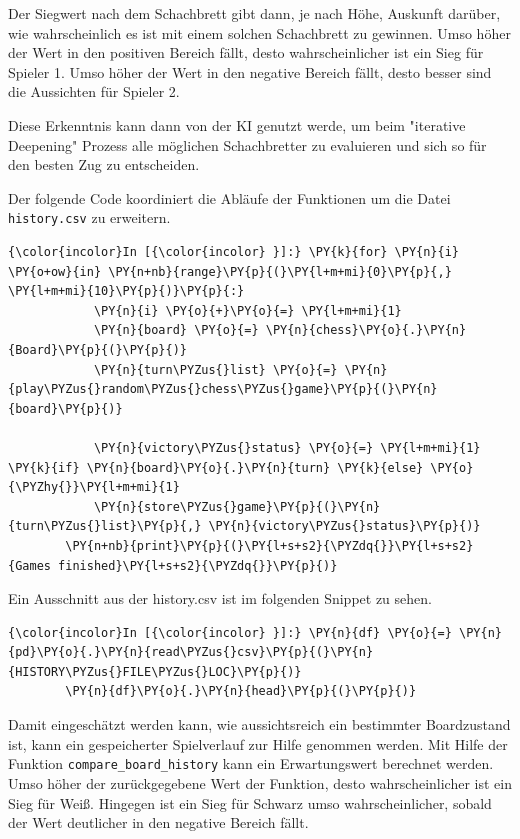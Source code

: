     Der Siegwert nach dem Schachbrett gibt dann, je nach Höhe, Auskunft
darüber, wie wahrscheinlich es ist mit einem solchen Schachbrett zu
gewinnen. Umso höher der Wert in den positiven Bereich fällt, desto
wahrscheinlicher ist ein Sieg für Spieler 1. Umso höher der Wert in den
negative Bereich fällt, desto besser sind die Aussichten für Spieler 2.

Diese Erkenntnis kann dann von der KI genutzt werde, um beim "iterative
Deepening" Prozess alle möglichen Schachbretter zu evaluieren und sich
so für den besten Zug zu entscheiden.

Der folgende Code koordiniert die Abläufe der Funktionen um die Datei
\texttt{history.csv} zu erweitern.

    \begin{Verbatim}[commandchars=\\\{\}]
{\color{incolor}In [{\color{incolor} }]:} \PY{k}{for} \PY{n}{i} \PY{o+ow}{in} \PY{n+nb}{range}\PY{p}{(}\PY{l+m+mi}{0}\PY{p}{,} \PY{l+m+mi}{10}\PY{p}{)}\PY{p}{:}
            \PY{n}{i} \PY{o}{+}\PY{o}{=} \PY{l+m+mi}{1}
            \PY{n}{board} \PY{o}{=} \PY{n}{chess}\PY{o}{.}\PY{n}{Board}\PY{p}{(}\PY{p}{)}
            \PY{n}{turn\PYZus{}list} \PY{o}{=} \PY{n}{play\PYZus{}random\PYZus{}chess\PYZus{}game}\PY{p}{(}\PY{n}{board}\PY{p}{)}
        
            \PY{n}{victory\PYZus{}status} \PY{o}{=} \PY{l+m+mi}{1} \PY{k}{if} \PY{n}{board}\PY{o}{.}\PY{n}{turn} \PY{k}{else} \PY{o}{\PYZhy{}}\PY{l+m+mi}{1}
            \PY{n}{store\PYZus{}game}\PY{p}{(}\PY{n}{turn\PYZus{}list}\PY{p}{,} \PY{n}{victory\PYZus{}status}\PY{p}{)}
        \PY{n+nb}{print}\PY{p}{(}\PY{l+s+s2}{\PYZdq{}}\PY{l+s+s2}{Games finished}\PY{l+s+s2}{\PYZdq{}}\PY{p}{)}
\end{Verbatim}


    Ein Ausschnitt aus der history.csv ist im folgenden Snippet zu sehen.

    \begin{Verbatim}[commandchars=\\\{\}]
{\color{incolor}In [{\color{incolor} }]:} \PY{n}{df} \PY{o}{=} \PY{n}{pd}\PY{o}{.}\PY{n}{read\PYZus{}csv}\PY{p}{(}\PY{n}{HISTORY\PYZus{}FILE\PYZus{}LOC}\PY{p}{)}
        \PY{n}{df}\PY{o}{.}\PY{n}{head}\PY{p}{(}\PY{p}{)}
\end{Verbatim}


    Damit eingeschätzt werden kann, wie aussichtsreich ein bestimmter
Boardzustand ist, kann ein gespeicherter Spielverlauf zur Hilfe genommen
werden. Mit Hilfe der Funktion \texttt{compare\_board\_history} kann ein
Erwartungswert berechnet werden. Umso höher der zurückgegebene Wert der
Funktion, desto wahrscheinlicher ist ein Sieg für Weiß. Hingegen ist ein
Sieg für Schwarz umso wahrscheinlicher, sobald der Wert deutlicher in
den negative Bereich fällt.

